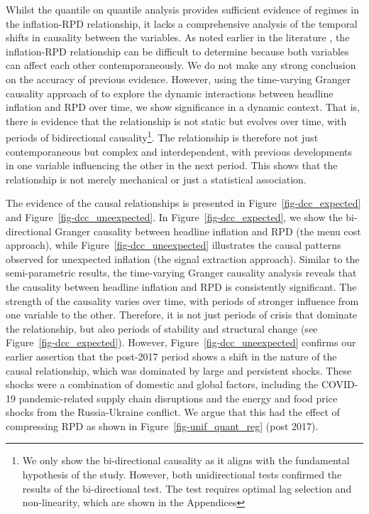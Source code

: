 \documentclass[
  letterpaper,
  DIV=11,
  numbers=noendperiod]{scrartcl}
\begin{document}
Whilst the quantile on quantile analysis provides sufficient evidence of
regimes in the inflation-RPD relationship, it lacks a comprehensive
analysis of the temporal shifts in causality between the variables. As
noted earlier in the literature \citep[for
example][]{grier1996, parsley1996}, the inflation-RPD relationship can
be difficult to determine because both variables can affect each other
contemporaneously. We do not make any strong conclusion on the accuracy
of previous evidence. However, using the time-varying Granger causality
approach of \citet{lu2014} to explore the dynamic interactions between
headline inflation and RPD over time, we show significance in a dynamic
context. That is, there is evidence that the relationship is not static
but evolves over time, with periods of bidirectional
causality\footnote{We only show the bi-directional causality as it
  aligns with the fundamental hypothesis of the study. However, both
  unidirectional tests confirmed the results of the bi-directional test.
  The test requires optimal lag selection and non-linearity, which are
  shown in the Appendices}. The relationship is therefore not just
contemporaneous but complex and interdependent, with previous
developments in one variable influencing the other in the next period.
This shows that the relationship is not merely mechanical or just a
statistical association.

The evidence of the causal relationships is presented in
Figure~\ref{fig-dcc_expected} and Figure~\ref{fig-dcc_uneexpected}. In
Figure~\ref{fig-dcc_expected}, we show the bi-directional Granger
causality between headline inflation and RPD (the menu cost approach),
while Figure~\ref{fig-dcc_uneexpected} illustrates the causal patterns
observed for unexpected inflation (the signal extraction approach).
Similar to the semi-parametric results, the time-varying Granger
causality analysis reveals that the causality between headline inflation
and RPD is consistently significant. The strength of the causality
varies over time, with periods of stronger influence from one variable
to the other. Therefore, it is not just periods of crisis that dominate
the relationship, but also periods of stability and structural change
(see Figure~\ref{fig-dcc_expected}). However,
Figure~\ref{fig-dcc_uneexpected} confirms our earlier assertion that the
post-2017 period shows a shift in the nature of the causal relationship,
which was dominated by large and persistent shocks. These shocks were a
combination of domestic and global factors, including the COVID-19
pandemic-related supply chain disruptions and the energy and food price
shocks from the Russia-Ukraine conflict. We argue that this had the
effect of compressing RPD as shown in Figure~\ref{fig-unif_quant_reg}
(post 2017).
\end{document}
